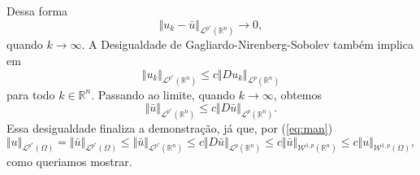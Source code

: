 \documentclass[a4paper, 11pt]{book}
\theoremstyle{definition}
\newcommand{\bR}{\mathbb{R}}
\newcommand{\cL}{\mathcal{L}}
\newcommand{\cW}{\mathcal{W}}
\begin{document}
\begin{prf}
    Dessa forma
    \[
        \Vert u_k - \bar u \Vert_{\cL^{p^*}(\bR^n)} \to 0,
    \]
    quando $k \to \infty$.
    A Desigualdade de Gagliardo-Nirenberg-Sobolev também implica em
    \[  
        \Vert u_k \Vert_{\cL^{p^*}(\bR^n)} \leqslant c \Vert Du_k \Vert_{\cL^p(\bR^n)}
    \]
    para todo $k \in \bR^n$.
    Passando ao limite, quando $k \to \infty$, obtemos
    \[
        \Vert \bar u \Vert_{\cL^{p^*}(\bR^n)} \leqslant c \Vert D \bar u \Vert_{\cL^p(\bR^n)}.
    \]
    Essa desigualdade finaliza a demonstração, já que, por (\ref{eq:man})
    \[
        \Vert u \Vert_{\cL^{p^*}(\Omega)} = \Vert \bar u \Vert_{\cL^{p^*}(\Omega)} \leqslant \Vert \bar u \Vert_{\cL^{p^*}(\bR^n)} \leqslant c \Vert D \bar u \Vert_{\cL^p(\bR^n)} \leqslant c \Vert \bar u \Vert_{\cW^{1,p}(\bR^n)} \leqslant c \Vert u \Vert_{\cW^{1,p}(\Omega)},
    \]
    como queriamos mostrar.
\end{prf}
\end{document}

